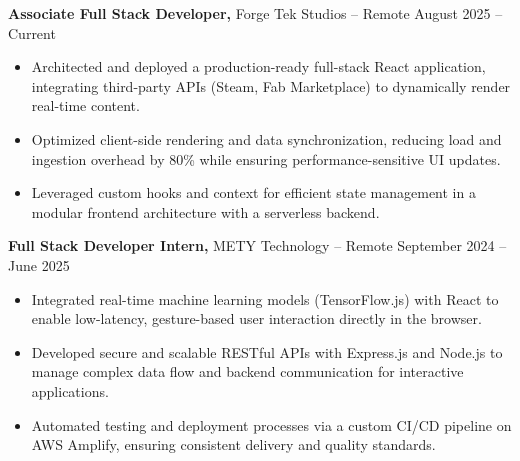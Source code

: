\documentclass[11pt]{article}       %
\begin{document}
\textbf{Associate Full Stack Developer,} {Forge Tek Studios} -- Remote \hfill August 2025 -- Current 
\vspace{-9pt}
\begin{itemize}
  \item Architected and deployed a production-ready full-stack React application, integrating third-party APIs (Steam, Fab Marketplace) to dynamically render real-time content.
  \item Optimized client-side rendering and data synchronization, reducing load and ingestion overhead by 80\% while ensuring performance-sensitive UI updates.
  \item Leveraged custom hooks and context for efficient state management in a modular frontend architecture with a serverless backend.
\end{itemize}

\textbf{Full Stack Developer Intern,} {METY Technology} -- Remote \hfill September 2024 -- June 2025 
\vspace{-9pt}
\begin{itemize}
  \item Integrated real-time machine learning models (TensorFlow.js) with React to enable low-latency, gesture-based user interaction directly in the browser.
  \item Developed secure and scalable RESTful APIs with Express.js and Node.js to manage complex data flow and backend communication for interactive applications.
  \item Automated testing and deployment processes via a custom CI/CD pipeline on AWS Amplify, ensuring consistent delivery and quality standards.
\end{itemize}
\end{document}
